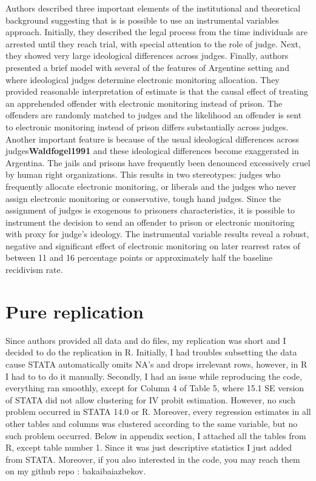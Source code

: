 \documentclass[a4paper,12pt]{article}
\begin{document}
Authors described three important elements of the institutional and theoretical background suggesting that is is possible to use an instrumental variables approach. Initially, they described the legal process from the time individuals are arrested until they reach trial, with special attention to the role of judge. Next, they showed very large ideological differences across judges. Finally, authors presented a brief model with several of the features of Argentine setting and where ideological judges determine electronic monitoring allocation.    
They provided reasonable interpretation of estimate is that the causal effect of treating an apprehended offender with electronic monitoring instead of prison. The offenders are randomly matched to judges and the likelihood an offender is sent to electronic monitoring instead of prison differs substantially across judges. Another important feature is because of the usual ideological differences across judges\textbf{Waldfogel1991}\cite{Waldfogel91} and these ideological differences become exaggerated in Argentina. The jails and prisons have frequently been denounced excessively cruel by human right organizations. This results in two stereotypes: judges who frequently allocate electronic monitoring, or liberals and the judges who never assign electronic monitoring or conservative, tough hand judges. Since the assignment of judges is exogenous to prisoners characteristics, it is possible to instrument the decision to send an offender to prison or electronic monitoring with proxy for judge's ideology. The instrumental variable results reveal a robust, negative and significant effect of electronic monitoring on later rearrest rates of between 11 and 16 percentage points or approximately half the baseline recidivism rate.   




\newpage
\section{Pure replication}
Since authors provided all data and do files, my replication was short and I decided to do the replication in R. Initially, I had troubles subsetting the data cause STATA automatically omits NA's and drops irrelevant rows, however, in R I had to to do it manually. Secondly, I had an issue while  reproducing the code, everything ran smoothly, except for Column 4 of Table 5, where 15.1 SE version of STATA did not allow clustering for IV probit estimation. However, no such problem occurred in STATA 14.0 or R. Moreover, every regression estimates in all other tables and columns was clustered according to the same variable, but no such problem occurred. Below in appendix section, I attached all the tables  from R, except table number 1. Since it was just descriptive statistics I just added from STATA. Moreover, if you also interested in the code, you may reach them on my github repo : bakaibaiazbekov. 
\end{document}
